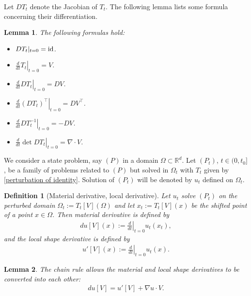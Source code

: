 \documentclass[oneside,11pt]{book}
\numberwithin{equation}{section}
\newtheorem{lemma}{Lemma}[section]
\newtheorem{definition}{Definition}[section]
\begin{document}
Let $DT_t$ denote the Jacobian of $T_t$. The following lemma lists some formula concerning their differentiation.
\begin{lemma}
    The following formulas hold:
    \begin{itemize}
        \item[(i)] $DT_t|_{t=0} = {\rm id}$.
        \item[(ii)] $\left.\frac{d}{dt}T_t\right|_{t=0} = V$.
        \item[(iii)] $\left.\frac{d}{dt}DT_t\right|_{t=0} = DV$.
        \item[(iv)] $\left.\frac{d}{dt}(DT_t)^\top\right|_{t=0} = DV^\top$.
        \item[(v)] $\left.\frac{d}{dt}DT_t^{-1}\right|_{t=0} = -DV$.
        \item[(vi)] $\left.\frac{d}{dt}\det DT_t\right|_{t=0} = \nabla\cdot V$.
    \end{itemize}
\end{lemma}
We consider a state problem, say $(P)$ in a domain $\Omega\subset\mathbb{R}^d$. Let $(P_t)$, $t\in(0,t_0]$, be a family of problems related to $(P)$ but solved in $\Omega_t$ with $T_t$ given by \eqref{perturbation of identity}. Solution of $(P_t)$ will be denoted by $u_t$ defined on $\Omega_t$.

\begin{definition}[Material derivative, local derivative]
    Let $u_t$ solve $(P_t)$ on the perturbed domain $\Omega_t := T_t[V](\Omega)$ and let $x_t := T_t[V](x)$ be the shifted point of a point $x\in\Omega$. Then material derivative is defined by
    \begin{align}
        du[V](x) := \left.\frac{d}{dt}\right|_{t=0}u_t(x_t),
    \end{align}
    and the \emph{local shape derivative} is defined by
    \begin{align}
        u'[V](x) := \left.\frac{d}{dt}\right|_{t=0}u_t(x).
    \end{align}
\end{definition}

\begin{lemma}
    \label{chain rule shape derivative}
    The chain rule allows the material and local shape derivatives to be converted into each other:
    \begin{align}
        \label{Schmidt2020 (4.12)}
        du[V] = u'[V] + \nabla u\cdot V.
    \end{align}
\end{lemma}
\end{document}
